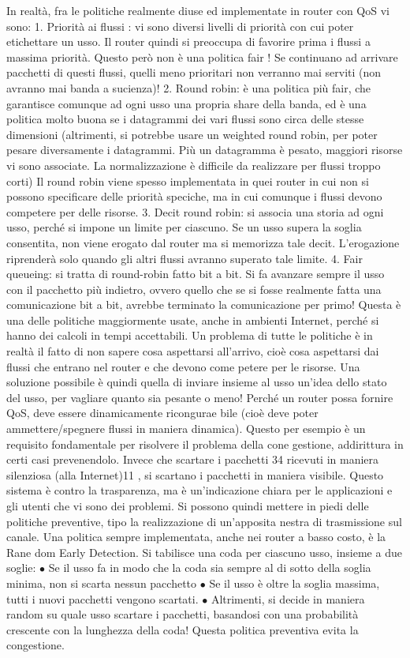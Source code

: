 In realtà, fra le politiche realmente diuse ed implementate in router con
QoS vi sono:
1. Priorità ai flussi : vi sono diversi livelli di priorità con cui poter etichettare
un usso. Il router quindi si preoccupa di favorire prima i flussi a massima
priorità. Questo però non è una politica fair ! Se continuano ad arrivare
pacchetti di questi flussi, quelli meno prioritari non verranno mai serviti
(non avranno mai banda a sucienza)!
2. Round robin: è una politica più fair, che garantisce comunque ad ogni
usso una propria share della banda, ed è una politica molto buona se i
datagrammi dei vari flussi sono circa delle stesse dimensioni (altrimenti,
si potrebbe usare un weighted round robin, per poter pesare diversamente
i datagrammi. Più un datagramma è pesato, maggiori risorse vi sono
associate. La normalizzazione è difficile da realizzare per flussi troppo
corti) Il round robin viene spesso implementata in quei router in cui non
si possono specificare delle priorità speciche, ma in cui comunque i flussi
devono competere per delle risorse.
3. Decit round robin: si associa una storia ad ogni usso, perché si impone
un limite per ciascuno. Se un usso supera la soglia consentita, non viene
erogato dal router ma si memorizza tale decit. L'erogazione riprenderà
solo quando gli altri flussi avranno superato tale limite.
4. Fair queueing: si tratta di round-robin fatto bit a bit. Si fa avanzare
sempre il usso con il pacchetto più indietro, ovvero quello che se si fosse
realmente fatta una comunicazione bit a bit, avrebbe terminato la comunicazione per primo! Questa è una delle politiche
maggiormente usate,
anche in ambienti Internet, perché si hanno dei calcoli in tempi accettabili.
Un problema di tutte le politiche è in realtà il fatto di non sapere cosa aspettarsi
all'arrivo, cioè cosa aspettarsi dai flussi che entrano nel router e che devono come
petere per le risorse. Una soluzione possibile è quindi quella di inviare insieme
al usso un'idea dello stato del usso, per vagliare quanto sia pesante o meno!
Perché un router possa fornire QoS, deve essere dinamicamente ricongurae
bile (cioè deve poter ammettere/spegnere flussi in maniera dinamica). Questo
per esempio è un requisito fondamentale per risolvere il problema della cone
gestione, addirittura in certi casi prevenendolo. Invece che scartare i pacchetti
34
ricevuti in maniera silenziosa (alla Internet)11 , si scartano i pacchetti in maniera
visibile. Questo sistema è contro la trasparenza, ma è un'indicazione chiara per
le applicazioni e gli utenti che vi sono dei problemi. Si possono quindi mettere
in piedi delle politiche preventive, tipo la realizzazione di un'apposita nestra di
trasmissione sul canale.
Una politica sempre implementata, anche nei router a basso costo, è la Rane
dom Early Detection. Si tabilisce una coda per ciascuno usso, insieme a due
soglie:
$\bullet$ Se il usso fa in modo che la coda sia sempre al di sotto della soglia
minima, non si scarta nessun pacchetto
$\bullet$ Se il usso è oltre la soglia massima, tutti i nuovi pacchetti vengono
scartati.
$\bullet$ Altrimenti, si decide in maniera random su quale usso scartare i pacchetti, basandosi con una probabilità
crescente con la lunghezza della
coda!
Questa politica preventiva evita la congestione.
